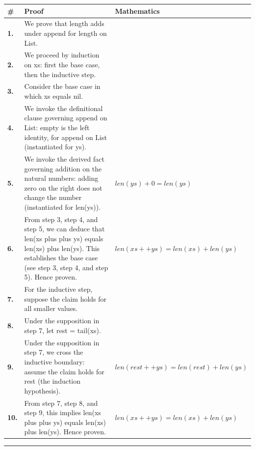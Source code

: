 \documentclass[11pt]{article}
\theoremstyle{definition}
\begin{document}
\begin{tabular}{@{} >{\raggedright\arraybackslash}p{} >{\raggedright\arraybackslash}p{} >{\raggedleft\arraybackslash}p{} @{}}
\textbf{\#} & \textbf{Proof} & \textbf{Mathematics} \\
\midrule
\textbf{1.} & We prove that length adds under append for length on List. & \\[0.45em]
\textbf{2.} & We proceed by induction on xs: first the base case, then the inductive step. & \\[0.45em]
\textbf{3.} & Consider the base case in which xs  equals  nil. & \\[0.45em]
\textbf{4.} & We invoke the definitional clause governing append on List: empty is the left identity, for append on List (instantiated for ys). & \\[0.45em]
\textbf{5.} & We invoke the derived fact governing addition on the natural numbers: adding zero on the right does not change the number (instantiated for len(ys)). & $\displaystyle len(ys) + 0 = len(ys)$ \\[0.45em]
\textbf{6.} & From step 3, step 4, and step 5, we can deduce that len(xs plus plus ys) equals len(xs) plus len(ys). This establishes the base case (see step 3, step 4, and step 5). Hence proven. & $\displaystyle len(xs ++ ys) = len(xs) + len(ys)$ \\[0.45em]
\textbf{7.} & For the inductive step, suppose the claim holds for all smaller values. & \\[0.45em]
\textbf{8.} & Under the supposition in step 7, let rest = tail(xs). & \\[0.45em]
\textbf{9.} & Under the supposition in step 7, we cross the inductive boundary: assume the claim holds for rest (the induction hypothesis). & $\displaystyle len(rest ++ ys) = len(rest) + len(ys)$ \\[0.45em]
\textbf{10.} & From step 7, step 8, and step 9, this implies len(xs plus plus ys) equals len(xs) plus len(ys). Hence proven. & $\displaystyle len(xs ++ ys) = len(xs) + len(ys)$ \\[0.45em]
\bottomrule
\end{tabular}
\label{thm:List-length-length_adds_under_append}
\par\medskip\hrule
\end{document}
